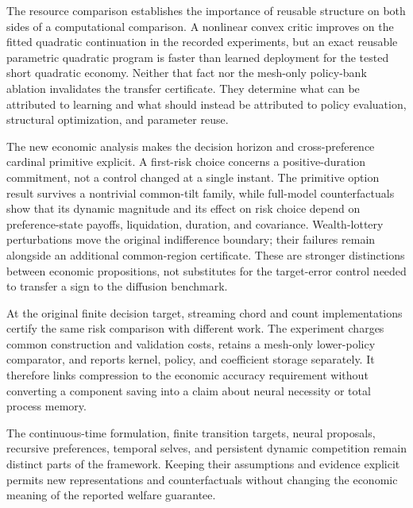 The resource comparison establishes the importance of reusable structure on both sides of a computational comparison. A nonlinear convex critic improves on the fitted quadratic continuation in the recorded experiments, but an exact reusable parametric quadratic program is faster than learned deployment for the tested short quadratic economy. Neither that fact nor the mesh-only policy-bank ablation invalidates the transfer certificate. They determine what can be attributed to learning and what should instead be attributed to policy evaluation, structural optimization, and parameter reuse.

The new economic analysis makes the decision horizon and cross-preference cardinal primitive explicit. A first-risk choice concerns a positive-duration commitment, not a control changed at a single instant. The primitive option result survives a nontrivial common-tilt family, while full-model counterfactuals show that its dynamic magnitude and its effect on risk choice depend on preference-state payoffs, liquidation, duration, and covariance. Wealth-lottery perturbations move the original indifference boundary; their failures remain alongside an additional common-region certificate. These are stronger distinctions between economic propositions, not substitutes for the target-error control needed to transfer a sign to the diffusion benchmark.

At the original finite decision target, streaming chord and count implementations certify the same risk comparison with different work. The experiment charges common construction and validation costs, retains a mesh-only lower-policy comparator, and reports kernel, policy, and coefficient storage separately. It therefore links compression to the economic accuracy requirement without converting a component saving into a claim about neural necessity or total process memory.

The continuous-time formulation, finite transition targets, neural proposals, recursive preferences, temporal selves, and persistent dynamic competition remain distinct parts of the framework. Keeping their assumptions and evidence explicit permits new representations and counterfactuals without changing the economic meaning of the reported welfare guarantee.
